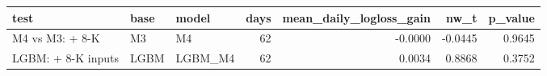 \begin{tabular}{lllrrrr}
\toprule
test & base & model & days & mean\_daily\_logloss\_gain & nw\_t & p\_value \\
\midrule
M4 vs M3: + 8-K & M3 & M4 & 62 & -0.0000 & -0.0445 & 0.9645 \\
LGBM: + 8-K inputs & LGBM & LGBM\_M4 & 62 & 0.0034 & 0.8868 & 0.3752 \\
\bottomrule
\end{tabular}

